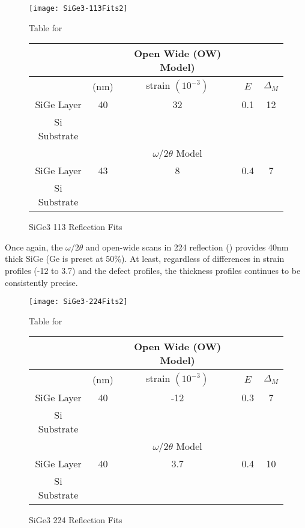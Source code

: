\begin{figure}[hc]%
\caption{SiGe3 113 Reflection Fits}
\label{SiGe3-113}
\begin{minipage}{0.85\linewidth}
\texttt{[image: SiGe3-113Fits2]}
\end{minipage}
\begin{minipage}{\linewidth}
\centering
\vspace{10pt}
Table for \\
\vspace{5pt}
\begin{tabular}{c|cccc}
			& 	&Open Wide (OW) Model)	 \\
\hline
			&	(nm)	&	strain	 $(10^{-3})$&	$E$ & $\Delta_M$\\
\hline
SiGe Layer		&  	40	&   32	 &0.1 & 12 	\\
Si Substrate		&	\textemdash & \textemdash&\textemdash\ &\textemdash	\\
\hline
			& &$\omega/2\theta$ Model \\
\hline
SiGe Layer		&	43	& 8	&0.4&7 	\\
Si Substrate		&	\textemdash & \textemdash&\textemdash\ &\textemdash
\end{tabular}
\end{minipage}
\end{figure}

Once again, the $\omega/2\theta$  and open-wide scans in 224 reflection () provides 40nm thick SiGe (Ge is preset at 50\%).  At least, regardless of differences in strain profiles (-12 to 3.7) and the defect profiles, the thickness profiles continues to be consistently precise.    

\begin{figure}[hc]%
\caption{SiGe3 224 Reflection Fits}
\label{SiGe3-224}
\begin{minipage}{0.85\linewidth}
\texttt{[image: SiGe3-224Fits2]}
\end{minipage}
\begin{minipage}{\linewidth}
\centering
\vspace{10pt}
Table for \\
\vspace{5pt}
\begin{tabular}{c|cccc}
			& 	&Open Wide (OW) Model)	 \\
\hline
			&	(nm)	&	strain	 $(10^{-3})$&	$E$ &  $\Delta_M$\\
\hline
SiGe Layer		&  	40	&      -12	 &0.3 & 7	\\
Si Substrate		&	\textemdash & \textemdash&\textemdash\ &\textemdash	\\
\hline
			& &$\omega/2\theta$ Model \\
\hline
SiGe Layer		&	40	& 3.7	&0.4	&10	\\
Si Substrate		&	\textemdash & \textemdash&\textemdash\ &\textemdash
\end{tabular}
\end{minipage}
\end{figure}



